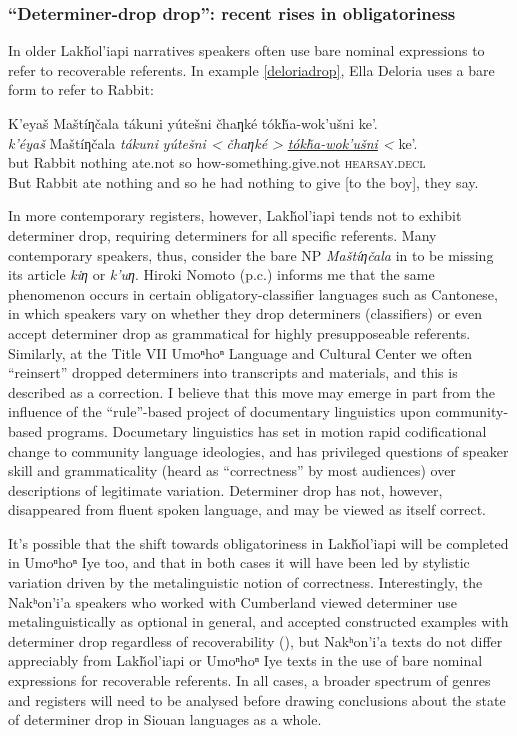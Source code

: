 \documentclass[output=paper]{LSP/langsci}
\begin{document}
\subsubsection{“Determiner-drop drop”: recent rises in obligatoriness}\label{determinerdropdrop}

	In older Lakȟol’iapi narratives speakers often use bare nominal expressions to refer to recoverable referents. In example \ref{deloriadrop}, Ella Deloria uses a bare form to refer to Rabbit:
	
\ea\label{deloriadrop}
	K’eyaš Maštíƞčala tákuni yútešni čhaƞké tókȟa-wok’ušni ke’.\footnotemark\\
\gll	\emph{k’éyaš} 	Maštíƞčala 	\emph{tákuni} 	\emph{yútešni <}	 \emph{čhaƞké >} 	\emph{\underline{tókȟa-wok’ušni} <}		ke’. \\
	but 			Rabbit		nothing	 	ate.not	 	 so 			 how-something.give.not 				\textsc{hearsay.decl}\\
\glt	But Rabbit ate nothing and so he had nothing to give [to the boy], they say.
\z

In more contemporary registers, however, Lakȟol’iapi tends not to exhibit determiner drop, requiring determiners for all specific referents. Many contemporary speakers, thus, consider the bare NP \emph{Maštíƞčala} in  to be missing its article \emph{kiƞ} or \emph{k’uƞ}. Hiroki Nomoto (p.c.) informs me that the same phenomenon occurs in certain obligatory-classifier languages such as Cantonese, in which speakers vary on whether they drop determiners (classifiers) or even accept determiner drop as grammatical for highly presupposeable referents. Similarly, at the Title VII Umoⁿhoⁿ Language and Cultural Center we often “reinsert” dropped determiners into transcripts and materials, and this is described as a correction. I believe that this move may emerge in part from the influence of the “rule”-based project of documentary linguistics upon community-based programs. Documetary linguistics has set in motion rapid codificational change to community language ideologies, and has privileged questions of speaker skill and grammaticality (heard as “correctness” by most audiences) over descriptions of legitimate variation. Determiner drop has not, however, disappeared from fluent spoken language, and may be viewed as itself correct.

	It’s possible that the shift towards obligatoriness in Lakȟol’iapi will be completed in Umoⁿhoⁿ Iye too, and that in both cases it will have been led by stylistic variation driven by the metalinguistic notion of correctness. Interestingly, the Nakʰon’i’a speakers who worked with Cumberland viewed determiner use metalinguistically as optional in general, and accepted constructed examples with determiner drop regardless of recoverability (\citealt[345]{Cumberland2005}), but Nakʰon’i’a texts do not differ appreciably from Lakȟol’iapi or Umoⁿhoⁿ Iye texts in the use of bare nominal expressions for recoverable referents. In all cases, a broader spectrum of genres and registers will need to be analysed before drawing conclusions about the state of determiner drop in Siouan languages as a whole.
\end{document}
